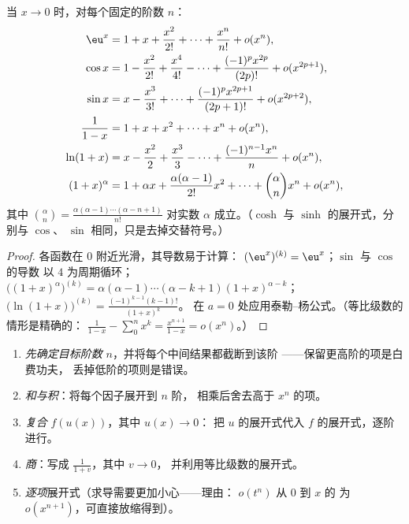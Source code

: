 \begin{proposition}[$0$ 处的标准展开式]
当 $x \to 0$ 时，对每个固定的阶数 $n$：
\begin{align*}
\eu^x &= 1 + x + \frac{x^2}{2!} + \dots + \frac{x^n}{n!} + o(x^n),\\
\cos x &= 1 - \frac{x^2}{2!} + \frac{x^4}{4!} - \dots
+ \frac{(-1)^p x^{2p}}{(2p)!} + o(x^{2p+1}),\\
\sin x &= x - \frac{x^3}{3!} + \dots + \frac{(-1)^p
x^{2p+1}}{(2p+1)!} + o(x^{2p+2}),\\
\frac{1}{1 - x} &= 1 + x + x^2 + \dots + x^n + o(x^n),\\
\ln(1 + x) &= x - \frac{x^2}{2} + \frac{x^3}{3} - \dots +
\frac{(-1)^{n-1} x^n}{n} + o(x^n),\\
(1 + x)^\alpha &= 1 + \alpha x + \frac{\alpha(\alpha-1)}{2!}x^2 +
\dots + \binom{\alpha}{n} x^n + o(x^n),
\end{align*}
其中 $\binom{\alpha}{n} = \frac{\alpha(\alpha - 1)\cdots(\alpha - n
+ 1)}{n!}$ 对实数 $\alpha$ 成立。（$\cosh$ 与 $\sinh$ 的展开式，分别与 $\cos$、
$\sin$ 相同，只是去掉交替符号。）
\label{prop:b1:taylor:standard}
\end{proposition}

\begin{proof}
各函数在 $0$ 附近光滑，其导数易于计算：
$(\eu^x)^{(k)} = \eu^x$；$\sin$ 与 $\cos$ 的导数
以 $4$ 为周期循环；$\bigl((1+x)^\alpha\bigr)^{(k)} = \alpha(\alpha -
1)\cdots(\alpha - k + 1)(1+x)^{\alpha - k}$；
$\bigl(\ln(1+x)\bigr)^{(k)} = \frac{(-1)^{k-1}(k-1)!}{(1+x)^k}$。
在 $a = 0$ 处应用泰勒–杨公式。（等比级数的情形是精确的：
$\frac{1}{1-x} - \sum_0^n x^k = \frac{x^{n+1}}{1 - x} = o(x^n)$。）
\end{proof}

\begin{method}[利用展开式计算]\label{met:b1:taylor:compute}
\begin{enumerate}
  \item \emph{先确定目标阶数} $n$，并将每个中间结果都截断到该阶
——保留更高阶的项是白费功夫，
        丢掉低阶的项则是错误。
  \item \emph{和与积}：将每个因子展开到 $n$ 阶，
        相乘后舍去高于 $x^n$ 的项。
  \item \emph{复合} $f(u(x))$，其中 $u(x) \to 0$：
        把 $u$ 的展开式代入 $f$ 的展开式，逐阶进行。
  \item \emph{商}：写成 $\frac{1}{1 + v}$，其中 $v \to 0$，
        并利用等比级数的展开式。
  \item \emph{逐项}展开式（求导需要更加小心——理由：
        $o(t^n)$ 从 $0$ 到 $x$ 的
        为 $o(x^{n+1})$，可直接放缩得到）。
\end{enumerate}
\end{method}


